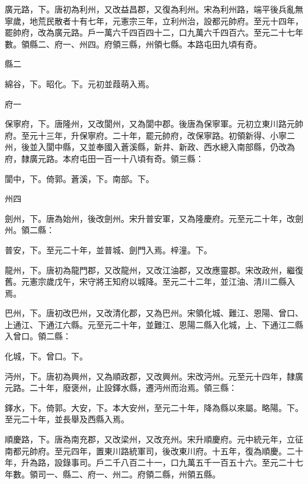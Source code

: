 \begin{pinyinscope}
 廣元路，下。唐初為利州，又改益昌郡，又復為利州。宋為利州路，端平後兵亂無寧歲，地荒民散者十有七年，元憲宗三年，立利州治，設都元帥府。至元十四年，罷帥府，改為廣元路。戶一萬六千四百四十二，口九萬六千四百六。至元二十七年數。領縣二、府一、州四。府領三縣，州領七縣。本路屯田九頃有奇。



 縣二



 綿谷，下。昭化。下。元初並葭萌入焉。



 府一



 保寧府，下。唐隆州，又改閬州，又為閬中郡。後唐為保寧軍。元初立東川路元帥府。至元十三年，升保寧府。二十年，罷元帥府，改保寧路。初領新得、小寧二州，後並入閬中縣，又並奉國入蒼溪縣，新井、新政、西水總入南部縣，仍改為府，隸廣元路。本府屯田一百一十八頃有奇。領三縣：



 閬中，下。倚郭。蒼溪，下。南部。下。



 州四



 劍州，下。唐為始州，後改劍州。宋升普安軍，又為隆慶府。元至元二十年，改劍州。領二縣：



 普安，下。至元二十年，並普城、劍門入焉。梓潼。下。



 龍州，下。唐初為龍門郡，又改龍州，又改江油郡，又改應靈郡。宋改政州，繼復舊。元憲宗歲戊午，宋守將王知府以城降。至元二十二年，並江油、清川二縣入焉。



 巴州，下。唐初改巴州，又改清化郡，又為巴州。宋領化城、難江、恩陽、曾口、上通江、下通江六縣。元至元二十年，並難江、恩陽二縣入化城，上、下通江二縣入曾口。領二縣：



 化城，下。曾口。下。



 沔州，下。唐初為興州，又為順政郡，又改興州。宋改沔州。元至元十四年，隸廣元路。二十年，廢褒州，止設鐸水縣，遷沔州而治焉。領三縣：



 鐸水，下。倚郭。大安，下。本大安州，至元二十年，降為縣以來屬。略陽。下。至元二十年，並長舉及西縣入焉。



 順慶路，下。唐為南充郡，又改梁州，又改充州。宋升順慶府。元中統元年，立征南都元帥府。至元四年，置東川路統軍司，後改東川府。十五年，復為順慶。二十年，升為路，設錄事司。戶二千八百二十一，口九萬五千一百五十六。至元二十七年數。領司一、縣二、府一、州二。府領二縣，州領五縣。




\end{pinyinscope}
